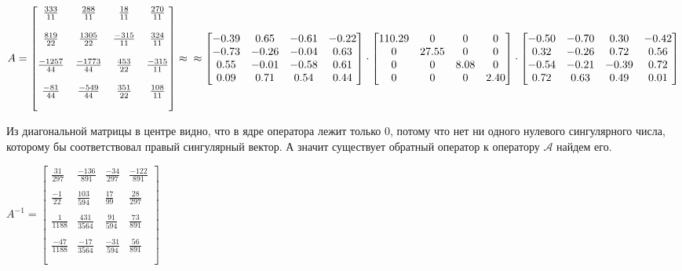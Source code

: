 \documentclass[a4paper]{article}
\begin{document}
$
A = \begin{bmatrix}
\frac{333}{11} & \frac{288}{11} & \frac{18}{11} & \frac{270}{11} \\\\
\frac{819}{22} & \frac{1305}{22} & \frac{-315}{11} & \frac{324}{11} \\\\
\frac{-1257}{44} & \frac{-1773}{44} & \frac{453}{22} & \frac{-315}{11} \\\\
\frac{-81}{44} & \frac{-549}{44} & \frac{351}{22} & \frac{108}{11} \\\\
\end{bmatrix} \approx \\
\approx \begin{bmatrix}
-0.39 & 0.65 & -0.61 & -0.22 \\
 -0.73 & -0.26 & -0.04 & 0.63 \\
 0.55 & -0.01 & -0.58 & 0.61 \\ 
 0.09 & 0.71 &  0.54 & 0.44 \\
\end{bmatrix} \cdot
\begin{bmatrix}
 110.29 & 0 & 0 & 0 \\
 0 & 27.55 & 0 & 0   \\
 0 & 0 & 8.08 & 0  \\
 0 & 0 & 0 & 2.40 \\
\end{bmatrix} \cdot
\begin{bmatrix}
 -0.50 & -0.70 & 0.30 & -0.42 \\
 0.32 & -0.26 & 0.72 & 0.56 \\
 -0.54 & -0.21 & -0.39 & 0.72 \\
 0.72 & 0.63 & 0.49 & 0.01 \\
\end{bmatrix}
$

Из диагональной матрицы в центре видно, что в ядре оператора лежит только 0, потому что нет ни одного нулевого сингулярного числа, которому бы соответствовал правый сингулярный вектор.
А значит существует обратный оператор к оператору $\mathcal{A}$ найдем его.

$
A^{-1} = \begin{bmatrix}
 \frac{31}{297} & \frac{-136}{891} & \frac{-34}{297} & \frac{-122}{891} \\\\
 \frac{-1}{22} & \frac{103}{594} & \frac{17}{99} & \frac{28}{297} \\\\
 \frac{1}{1188} & \frac{431}{3564} & \frac{91}{594} & \frac{73}{891} \\\\
 \frac{-47}{1188} & \frac{-17}{3564} & \frac{-31}{594} & \frac{56}{891} \\\\
\end{bmatrix}
$
\end{document}
